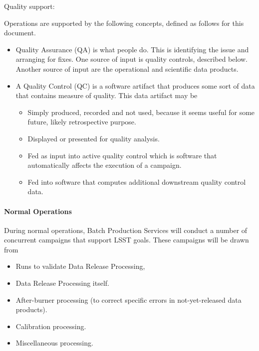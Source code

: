 Quality support:

Operations are supported by the following concepts, defined as follows for this
document.

\begin{itemize}

\item Quality Assurance (QA) is what people do. This is identifying the issue
and arranging for fixes. One source of input is quality controls, described
below. Another source of input are the operational and scientific data products.

\item A Quality Control (QC) is a software artifact that produces some sort of
data that contains measure of quality. This data artifact may be

    \begin{itemize}

    \item Simply produced, recorded and not used, because it seems useful for
    some future, likely retrospective purpose.

    \item Displayed or presented for quality analysis.

    \item Fed as input into active quality control which is software that
    automatically affects the execution of a campaign.

    \item Fed into software that computes additional downstream quality control
    data.

    \end{itemize}

\end{itemize}

\paragraph{Normal Operations}

During normal operations, Batch Production Services will conduct a number of
concurrent campaigns that support LSST goals. These campaigns will be drawn from

\begin{itemize}

\item Runs to validate Data Release Processing,

\item Data Release Processing itself.

\item After-burner processing (to correct specific errors in not-yet-released
data products).

\item Calibration processing.

\item Miscellaneous processing.

\end{itemize}

